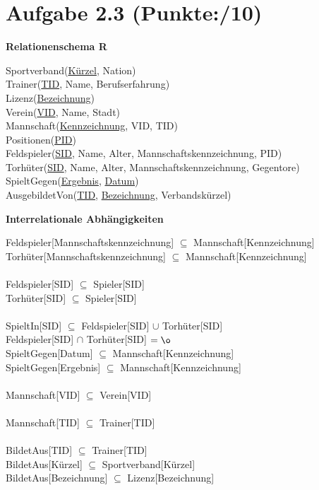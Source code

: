 \documentclass[11pt, a4paper]{article}
\newcommand{\blattnummer}{2}
\newcommand{\ppp}{10}
\newcommand{\aufgabe}[2] {\section*{Aufgabe \blattnummer.#1 (Punkte:\qquad/#2)}}
\begin{document}
\aufgabe{3}{\ppp}\null
\begin{adjustwidth}{20pt}{20pt}
\textbf{Relationenschema R}
\begin{adjustwidth}{20pt}{20pt}
Sportverband(\underline{Kürzel}, Nation)\\
Trainer(\underline{TID}, Name, Berufserfahrung)\\
Lizenz(\underline{Bezeichnung})\\
Verein(\underline{VID}, Name, Stadt)\\
Mannschaft(\underline{Kennzeichnung}, VID, TID)\\
Positionen(\underline{PID})\\
Feldspieler(\underline{SID}, Name, Alter, Mannschaftskennzeichnung, PID)\\
Torhüter(\underline{SID}, Name, Alter, Mannschaftskennzeichnung, Gegentore)\\
SpieltGegen(\underline{Ergebnis}, \underline{Datum})\\
AusgebildetVon(\underline{TID}, \underline{Bezeichnung}, Verbandskürzel)\\
\end{adjustwidth}
\newpage
\noindent\textbf{Interrelationale Abhängigkeiten}
\begin{adjustwidth}{20pt}{20pt}
Feldspieler[Mannschaftskennzeichnung] $\subseteq$ Mannschaft[Kennzeichnung]\\
Torhüter[Mannschaftskennzeichnung] $\subseteq$ Mannschaft[Kennzeichnung]\\
\ \\
Feldspieler[SID] $\subseteq$ Spieler[SID]\\
Torhüter[SID] $\subseteq$ Spieler[SID]\\
\ \\
SpieltIn[SID] $\subseteq$ Feldspieler[SID] $\cup$ Torhüter[SID]\\
Feldspieler[SID] $\cap$ Torhüter[SID] $= \o$\\
SpieltGegen[Datum] $\subseteq$ Mannschaft[Kennzeichnung]\\
SpieltGegen[Ergebnis] $\subseteq$ Mannschaft[Kennzeichnung]\\
\ \\
Mannschaft[VID] $\subseteq$ Verein[VID]\\
\ \\
Mannschaft[TID] $\subseteq$ Trainer[TID]\\
\ \\
BildetAus[TID] $\subseteq$ Trainer[TID]\\
BildetAus[Kürzel] $\subseteq$ Sportverband[Kürzel]\\
BildetAus[Bezeichnung] $\subseteq$ Lizenz[Bezeichnung]\\
\end{adjustwidth}
\end{adjustwidth}
\end{document}
